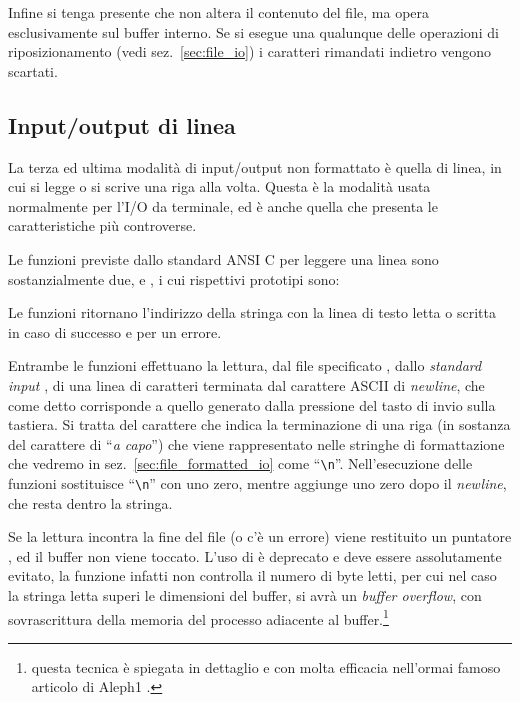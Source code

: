 Infine si tenga presente che  non altera il contenuto del file,
ma opera esclusivamente sul buffer interno. Se si esegue una qualunque delle
operazioni di riposizionamento (vedi sez.~\ref{sec:file_io}) i caratteri
rimandati indietro vengono scartati.


\subsection{Input/output di linea}
\label{sec:file_line_io}

La terza ed ultima modalità di input/output non formattato è quella di linea,
in cui si legge o si scrive una riga alla volta. Questa è la modalità usata
normalmente per l'I/O da terminale, ed è anche quella che presenta le
caratteristiche più controverse.

Le funzioni previste dallo standard ANSI C per leggere una linea sono
sostanzialmente due,  e , i cui rispettivi
prototipi sono:

\begin{funcproto}{
}

{Le funzioni ritornano l'indirizzo della stringa con la linea di testo letta o
  scritta in caso di successo e  per un errore.}
\end{funcproto}
 
Entrambe le funzioni effettuano la lettura, dal file specificato ,
dallo \textit{standard input} , di una linea di caratteri terminata
dal carattere ASCII di \textit{newline}, che come detto corrisponde a quello
generato dalla pressione del tasto di invio sulla tastiera. Si tratta del
carattere che indica la terminazione di una riga (in sostanza del carattere di
``\textsl{a capo}'') che viene rappresentato nelle stringhe di formattazione
che vedremo in sez.~\ref{sec:file_formatted_io} come
``\verb|\n|''. Nell'esecuzione delle funzioni  sostituisce
``\verb|\n|'' con uno zero, mentre  aggiunge uno zero dopo il
\textit{newline}, che resta dentro la stringa.


Se la lettura incontra la fine del file (o c'è un errore) viene restituito un
puntatore , ed il buffer  non viene toccato.  L'uso di
 è deprecato e deve essere assolutamente evitato, la funzione
infatti non controlla il numero di byte letti, per cui nel caso la stringa
letta superi le dimensioni del buffer, si avrà un \textit{buffer overflow},
con sovrascrittura della memoria del processo adiacente al
buffer.\footnote{questa tecnica è spiegata in dettaglio e con molta efficacia
  nell'ormai famoso articolo di Aleph1 \cite{StS}.}

